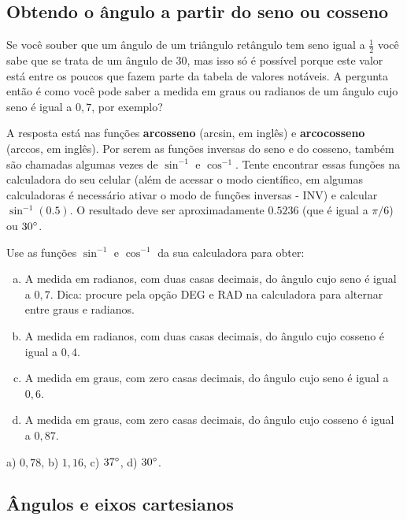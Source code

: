 \documentclass[main.tex]{subfiles}
\begin{document}
\subsection*{Obtendo o ângulo a partir do seno ou cosseno}

Se você souber que um ângulo de um triângulo retângulo tem seno igual a $\frac{1}{2}$ você sabe que se trata de um ângulo de 30\degree, mas isso só é possível porque este valor está entre os poucos que fazem parte da tabela de valores notáveis. A pergunta então é como você pode saber a medida em graus ou radianos de um ângulo cujo seno é igual a $0,7$, por exemplo?

A resposta está nas funções \textbf{arcosseno} (arcsin, em inglês) e \textbf{arcocosseno} (arccos, em inglês). Por serem as funções inversas do seno e do cosseno, também são chamadas algumas vezes de $\sin^{-1}$ e $\cos^{-1}$. Tente encontrar essas funções na calculadora do seu celular (além de acessar o modo científico, em algumas calculadoras é necessário ativar o modo de funções inversas - INV) e calcular $\sin^{-1}(0.5)$. O resultado deve ser aproximadamente $0.5236$ (que é igual a $\pi/6$) ou $30\degree$.

\begin{questao}
Use as funções $\sin^{-1}$ e $\cos^{-1}$ da sua calculadora para obter:
\begin{enumerate}[a)]
\item A medida em radianos, com duas casas decimais, do ângulo cujo seno é igual a $0,7$. Dica: procure pela opção DEG e RAD na calculadora para alternar entre graus e radianos.
\item A medida em radianos, com duas casas decimais, do ângulo cujo cosseno é igual a $0,4$.
\item A medida em graus, com zero casas decimais, do ângulo cujo seno é igual a $0,6$. 
\item A medida em graus, com zero casas decimais, do ângulo cujo cosseno é igual a $0,87$.
\end{enumerate}
\end{questao}

\begin{gabarito}
	\begin{gabaritoQuestao}
		a) $0,78$, b) $1,16$, c) $37\degree$, d) $30\degree$.
	\end{gabaritoQuestao}
\end{gabarito}

\subsection*{Ângulos e eixos cartesianos}
\end{document}
